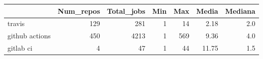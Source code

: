 \begin{tabular}{lrrrrrr}
\toprule
{} &  Num\_repos &  Total\_jobs &  Min &  Max &  Media &  Mediana \\
\midrule
travis         &        129 &         281 &    1 &   14 &   2.18 &      2.0 \\
github actions &        450 &        4213 &    1 &  569 &   9.36 &      4.0 \\
gitlab ci      &          4 &          47 &    1 &   44 &  11.75 &      1.5 \\
\bottomrule
\end{tabular}

